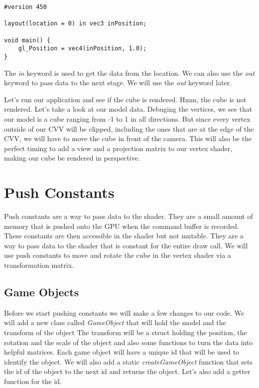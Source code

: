 \documentclass[12pt]{report} \usepackage{preamble}
\begin{document}
\begin{lstlisting}[Language=C++]
#version 450

layout(location = 0) in vec3 inPosition;

void main() {
	gl_Position = vec4(inPosition, 1.0);
}
\end{lstlisting}

The \textit{in} keyword is used to get the data from the location. We can also use the \textit{out} keyword to pass data to the next stage.
We will use the \textit{out} keyword later.

Let's run our application and see if the cube is rendered. Hmm, the cube is not rendered. Let's take a look at our model data.
Debuging the vertices, we see that our model is a cube ranging from -1 to 1 in all directions. But since every vertex outside of
our \ac{CVV} will be clipped, including the ones that are at the edge of the \ac{CVV}, we will have to move the cube in front of the camera.
This will also be the perfect timing to add a view and a projection matrix to our vertex shader, making our cube be rendered in perspective.

\section{Push Constants}

Push constants are a way to pass data to the shader. They are a small amount of memory that is pushed onto the \ac{GPU} when the command buffer is recorded.
These constants are then accessible in the shader but not mutable. They are a way to pass data to the shader that is constant for the entire draw call.
We will use push constants to move and rotate the cube in the vertex shader via a transformation matrix.

\subsection{Game Objects}

Before we start pushing constants we will make a few changes to our code. We will add a new class called \textit{GameObject} that will hold the model and the transform of the object
The transform will be a struct holding the position, the rotation and the scale of the object and also some functions to turn the data into helpful matrices.
Each game object will have a unique id that will be used to identify the object. We will also add a static \textit{createGameObject} function that
sets the id of the object to the next id and returns the object. Let's also add a getter function for the id.
\end{document}
